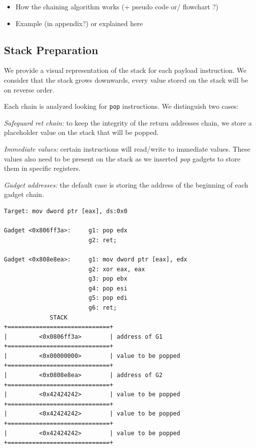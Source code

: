\documentclass[10pt,twocolumn]{article}
\begin{document}
\begin{itemize}
    \item How the chaining algorithm works (+ pseudo code or/ flowchart ?)
    \item Example (in appendix?) or explained here
\end{itemize}

\subsection{Stack Preparation}

We provide a visual representation of the stack for each payload instruction.
We consider that the stack grows downwards, every value stored on the stack
will be on reverse order.

Each chain is analyzed looking for \texttt{pop} instructions. We distinguish
two cases:

\textit{Safeguard ret chain:} to keep the integrity of the return addresses
chain, we store a placeholder value on the stack that will be popped.

\textit{Immediate values:} certain instructions will read/write to immediate
values. These values also need to be present on the stack as we inserted
\textit{pop} gadgets to store them in specific registers.

\textit{Gadget addresses:} the default case is storing the address of the
beginning of each gadget chain.

\begin{lstlisting}[float=h,aboveskip=\medskipamount,belowskip=-10pt]
Target: mov dword ptr [eax], ds:0x0

Gadget <0x806ff3a>:     g1: pop edx
                        g2: ret;
                   
Gadget <0x808e8ea>:     g1: mov dword ptr [eax], edx
                        g2: xor eax, eax
                        g3: pop ebx
                        g4: pop esi
                        g5: pop edi
                        g6: ret;
             STACK
+=============================+
|         <0x0806ff3a>        | address of G1
+=============================+
|         <0x00000000>        | value to be popped
+=============================+
|         <0x0808e8ea>        | address of G2
+=============================+
|         <0x42424242>        | value to be popped
+=============================+
|         <0x42424242>        | value to be popped
+=============================+
|         <0x42424242>        | value to be popped
+=============================+
\end{lstlisting}
\end{document}
